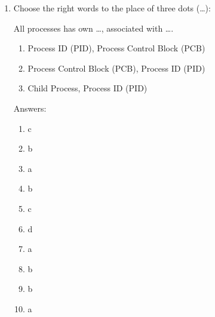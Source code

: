 \documentclass[paper=8.5in:11in]{scrartcl}
\begin{document}
\begin{enumerate}
\item Choose the right words to the place of three dots (\ldots):

All processes has own \ldots, associated with \ldots.
\begin{enumerate}[label=\alph*)]
\item Process ID (PID), Process Control Block (PCB)
\item Process Control Block (PCB), Process ID (PID)
\item Child Process, Process ID (PID)
\end{enumerate}

\newpage


Answers:

\begin{enumerate}[label=\arabic*)]

\item c
\item b
\item a
\item b
\item c
\item d
\item a
\item b
\item b
\item a


\end{enumerate}

\end{enumerate}
\end{document}
